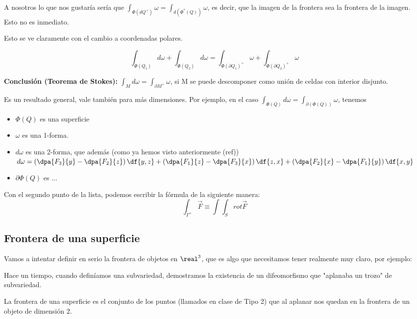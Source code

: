 
A nosotros lo que nos gustaría sería que $\displaystyle\int_{\Phi(dQ^+)} \omega = \int_{d(\Phi^{\ast}(Q))} \omega$, es decir, que la imagen de la frontera sea la frontera de la imagen. Esto no es inmediato.

Esto se ve claramente con el cambio a coordenadas polares.

\[
\int_{\Phi(Q_1)}d\omega + \int_{\Phi(Q_2)}d\omega=
\int_{\Phi(\partial  Q_1)^+}\omega+\int_{\Phi(\partial  Q_2)^+}\omega
\]

\textbf{Conclusión (Teorema de Stokes):} $\displaystyle\int_M d\omega = \int_{\partial  M^+}\omega$, si M se puede descomponer como unión de celdas con interior disjunto. 

\obs Es un resultado general, vale también para más dimensiones. Por ejemplo, en el caso $\displaystyle \int_{\Phi(Q)} d\omega = \int_{\partial (\Phi(Q))} \omega$, tenemos
\begin{itemize}
\item $\Phi(Q)$ es una superficie
\item $\omega$ es una 1-forma.
\item $d\omega$ es una 2-forma, que además (como ya hemos visto anteriormente (ref)) $d\omega = \left(\dpa{F_3}{y}-\dpa{F_2}{z}\right) \df{y,z} + 
\left(\dpa{F_1}{z}-\dpa{F_3}{x}\right) \df{z,x} + 
\left(\dpa{F_2}{x}-\dpa{F_1}{y}\right) \df{x,y}$
\item $\partial \Phi(Q)$ es ... 
\end{itemize} 
Con el segundo punto de la lista, podemos escribir la fórmula de la siguiente manera:
\[
\int_{\Gamma^+} \overrightarrow{F} \equiv \int \int_S rot \overrightarrow{F}
\]

\subsection{Frontera de una superficie}
Vamos a intentar definir en serio la frontera de objetos en $\real^3$, que es algo que necesitamos tener realmente muy claro, por ejemplo:


Hace un tiempo, cuando definíamos una subvariedad, demostramos la existencia de un difeomorfismo que "aplanaba un trozo" de subvariedad. 

La frontera de una superficie es el conjunto de los puntos (llamados en clase de Tipo 2) que al aplanar nos quedan en la frontera de un objeto de dimensión 2.

